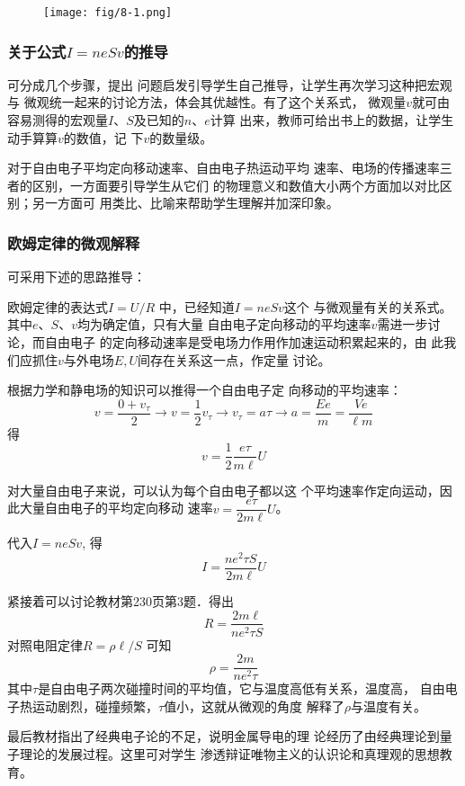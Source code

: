 \begin{figure}[htp]
    \centering
\texttt{[image: fig/8-1.png]}
    \caption{}
\end{figure}

\subsubsection{关于公式$I=neSv$的推导}

可分成几个步骤，提出
问题启发引导学生自己推导，让学生再次学习这种把宏观与
微观统一起来的讨论方法，体会其优越性。有了这个关系式，
微观量$v$就可由容易测得的宏观量$I$、$S$及已知的$n$、$e$计算
出来，教师可给出书上的数据，让学生动手算算$v$的数值，记
下$v$的数量级。

对于自由电子平均定向移动速率、自由电子热运动平均
速率、电场的传播速率三者的区别，一方面要引导学生从它们
的物理意义和数值大小两个方面加以对比区别；另一方面可
用类比、比喻来帮助学生理解并加深印象。

\subsubsection{欧姆定律的微观解释}

可采用下述的思路推导：

欧姆定律的表达式$I=U/R$
中，已经知道$I=neSv$这个
与微观量有关的关系式。其中$e$、$S$、$v$均为确定值，只有大量
自由电子定向移动的平均速率$v$需进一步讨论，而自由电子
的定向移动速率是受电场力作用作加速运动积累起来的，由
此我们应抓住$v$与外电场$E,U$间存在关系这一点，作定量
讨论。

根据力学和静电场的知识可以推得一个自由电子定
向移动的平均速率：
\[v=\frac{0+v_{\tau}}{2}\to v=\frac{1}{2}v_{\tau}\to v_{\tau}=a\tau\to a=\frac{Ee}{m}=\frac{Ve}{\ell m}\]
得\[v=\frac{1}{2}\frac{e\tau }{m\ell }U\]

对大量自由电子来说，可以认为每个自由电子都以这
个平均速率作定向运动，因此大量自由电子的平均定向移动
速率$v=\dfrac{e\tau }{2m\ell }U$。

代入$I=neSv$, 得
\[I=\frac{ne^2\tau S}{2m\ell}U\]

紧接着可以讨论教材第230页第3题．得出
\[R=\frac{2m\ell}{ne^2\tau S}\]
对照电阻定律$R=\rho\ell /S$
可知
\[\rho=\frac{2m}{ne^2\tau}\]
其中$\tau$是自由电子两次碰撞时间的平均值，它与温度高低有关系，温度高，
自由电子热运动剧烈，碰撞频繁，$\tau$值小，这就从微观的角度
解释了$\rho$与温度有关。

最后教材指出了经典电子论的不足，说明金属导电的理
论经历了由经典理论到量子理论的发展过程。这里可对学生
渗透辩证唯物主义的认识论和真理观的思想教育。

